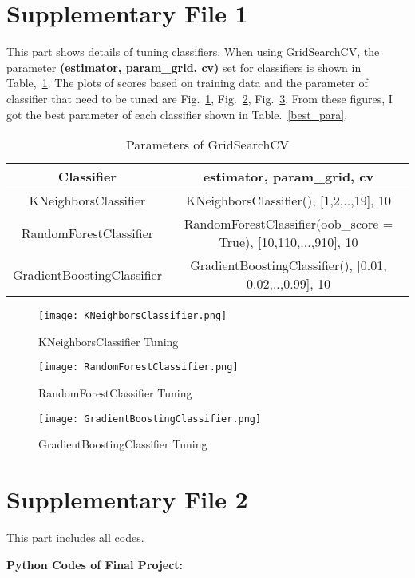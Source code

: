 \documentclass{article}
\begin{document}
\newpage
\section*{Supplementary File 1}
This part shows details of tuning classifiers.
When using GridSearchCV, the parameter \textbf{(estimator, param\_grid, cv)} set for classifiers is shown in Table,~\ref{classifier_para}. The plots of scores based on training data and the parameter of classifier that need to be tuned are Fig.~\ref{KN_t}, Fig.~\ref{forest_t}, Fig.~\ref{boost_t}. From these figures, I got the best parameter of each classifier shown in Table.~\ref{best_para}.

\begin{table}[h!]
\centering

\caption{Parameters of GridSearchCV}
\label{classifier_para}
\begin{tabular}{  | c | c |   }

\hline
Classifier & estimator, param\_grid, cv  \\
\hline
KNeighborsClassifier & KNeighborsClassifier(), [1,2,..,19], 10 \\
\hline
RandomForestClassifier & RandomForestClassifier(oob\_score = True), [10,110,...,910], 10 \\
\hline
GradientBoostingClassifier & GradientBoostingClassifier(), [0.01, 0.02,..,0.99], 10 \\
\hline
 \end{tabular}
\end{table}

\begin{figure}[!]
    		\texttt{[image: KNeighborsClassifier.png]}
		\centering
		\caption{KNeighborsClassifier Tuning }
		\label{KN_t}
    		\end{figure}
		
\begin{figure}[!]
    		\texttt{[image: RandomForestClassifier.png]}
		\centering
		\caption{RandomForestClassifier Tuning }
		\label{forest_t}
    		\end{figure}

\begin{figure}[!]
    		\texttt{[image: GradientBoostingClassifier.png]}
		\centering
		\caption{GradientBoostingClassifier Tuning }
		\label{boost_t}
    		\end{figure}


\newpage
\section*{Supplementary File 2}	
This part includes all codes.

\textbf{Python Codes of Final Project:}
	


\renewcommand\refname{Reference}


\end{document}

